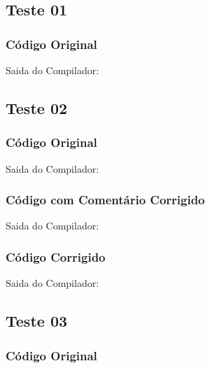 \subsection{Teste 01}
\label{subsec:lexicoTeste01}

\subsubsection{Código Original}


Saida do Compilador:



\subsection{Teste 02}
\label{subsec:lexicoTeste02}

\subsubsection{Código Original}


Saida do Compilador:




\subsubsection{Código com Comentário Corrigido}


Saida do Compilador:




\subsubsection{Código Corrigido}


Saida do Compilador:




\subsection{Teste 03}
\label{subsec:lexicoTeste03}

\subsubsection{Código Original}


